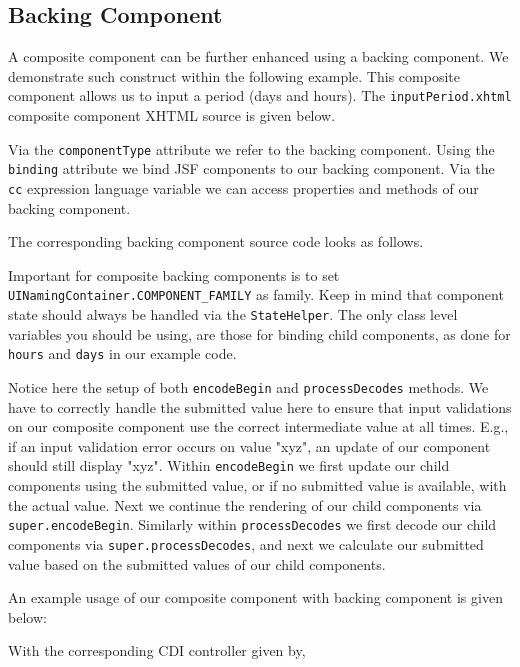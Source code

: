 \subsection{Backing Component}
A composite component can be further enhanced using a backing component.
We demonstrate such construct within the following example.
This composite component allows us to input a period (days and hours).
The \texttt{inputPeriod.xhtml} composite component XHTML source is given below.

Via the \texttt{componentType} attribute we refer to the backing component.
Using the \texttt{binding} attribute we bind JSF components to our backing component.
Via the \texttt{cc} expression language variable we can access properties and methods of our backing component.

The corresponding backing component source code looks as follows.

Important for composite backing components is to set \texttt{UINamingContainer.COMPONENT\_FAMILY} as family.
Keep in mind that component state should always be handled via the \texttt{StateHelper}.
The only class level variables you should be using, are those for binding child components, as done for \texttt{hours} and \texttt{days} in our example code.

Notice here the setup of both \texttt{encodeBegin} and \texttt{processDecodes} methods.
We have to correctly handle the submitted value here to ensure that input validations on our composite component use the correct intermediate value at all times.
E.g., if an input validation error occurs on value "xyz", an update of our component should still display "xyz".
Within \texttt{encodeBegin} we first update our child components using the submitted value, or if no submitted value is available, with the actual value.
Next we continue the rendering of our child components via \texttt{super.encodeBegin}.
Similarly within \texttt{processDecodes} we first decode our child components via \texttt{super.processDecodes}, and next we calculate our submitted value based on the submitted values of our child components.

An example usage of our composite component with backing component is given below:

With the corresponding CDI controller given by,


